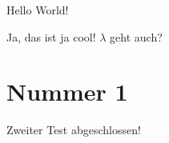 \documentclass{article}
\begin{document}
Hello World!

Ja, das ist ja cool! $\lambda$ geht auch?

\section{Nummer 1}

Zweiter Test abgeschlossen!
\end{document}
